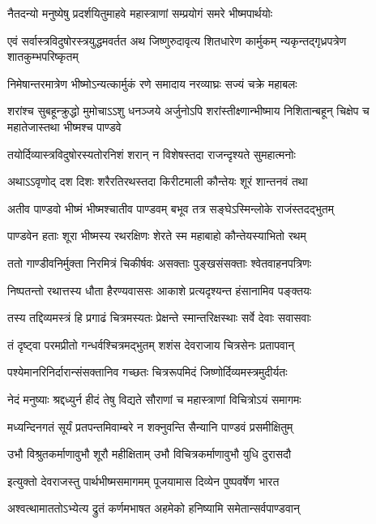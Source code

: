 \twolineshloka
{नैतदन्यो मनुष्येषु प्रदर्शयितुमाहवे}
{महास्त्राणां सम्प्रयोगं समरे भीष्मपार्थयोः}


\onelineshloka
{एवं सर्वास्त्रविदुषोरस्त्रयुद्धमवर्तत}
\twolineshloka
{अथ जिष्णुरुदावृत्य शितधारेण कार्मुकम्}
{न्यकृन्तद्गृध्रपत्रेण शातकुम्भपरिष्कृतम्}


\twolineshloka
{निमेषान्तरमात्रेण भीष्मोऽन्यत्कार्मुकं रणे}
{समादाय नरव्याघ्रः सज्यं चक्रे महाबलः}


\threelineshloka
{शरांश्च सुबहून्क्रुद्धो मुमोचाऽऽशु धनञ्जये}
{अर्जुनोऽपि शरांस्तीक्ष्णान्भीष्माय निशितान्बहून्}
{चिक्षेप च महातेजास्तथा भीष्मश्च पाण्डवे}


\twolineshloka
{तयोर्दिव्यास्त्रविदुषोरस्यतोरनिशं शरान्}
{न विशेषस्तदा राजन्दृश्यते सुमहात्मनोः}


\twolineshloka
{अथाऽऽवृणोद् दश दिशः शरैरतिरथस्तदा}
{किरीटमाली कौन्तेयः शूरं शान्तनवं तथा}


\twolineshloka
{अतीव पाण्डवो भीष्मं भीष्मश्चातीव पाण्डवम्}
{बभूव तत्र सङ्घेऽस्मिन्लोके राजंस्तदद्भुतम्}


\twolineshloka
{पाण्डवेन हताः शूरा भीष्मस्य रथरक्षिणः}
{शेरते स्म महाबाहो कौन्तेयस्याभितो रथम्}


\twolineshloka
{ततो गाण्डीवनिर्मुक्ता निरमित्रं चिकीर्षवः}
{असक्ताः पुङ्खसंसक्ताः श्वेतवाहनपत्रिणः}


\twolineshloka
{निष्पतन्तो रथात्तस्य धौता हैरण्यवाससः}
{आकाशे प्रत्यदृश्यन्त हंसानामिव पङ्क्तयः}


\twolineshloka
{तस्य तद्दिव्यमस्त्रं हि प्रगाढं चित्रमस्यतः}
{प्रेक्षन्ते स्मान्तरिक्षस्थाः सर्वे देवाः सवासवाः}


\twolineshloka
{तं दृष्ट्वा परमप्रीतो गन्धर्वश्चित्रमद्भुतम्}
{शशंस देवराजाय चित्रसेनः प्रतापवान्}


\twolineshloka
{पश्येमानरिनिर्दारान्संसक्तानिव गच्छतः}
{चित्ररूपमिदं जिष्णोर्दिव्यमस्त्रमुदीर्यतः}


\twolineshloka
{नेदं मनुष्याः श्रद्दध्युर्न हीदं तेषु विद्यते}
{सौराणां च महास्त्राणां विचित्रोऽयं समागमः}


\twolineshloka
{मध्यन्दिनगतं सूर्यं प्रतपन्तमिवाम्बरे}
{न शक्नुवन्ति सैन्यानि पाण्डवं प्रसमीक्षितुम्}


\twolineshloka
{उभौ विश्रुतकर्माणावुभौ शूरौ महीक्षिताम्}
{उभौ विचित्रकर्माणावुभौ युधि दुरासदौ}


\twolineshloka
{इत्युक्तो देवराजस्तु पार्थभीष्मसमागमम्}
{पूजयामास दिव्येन पुष्पवर्षेण भारत}


\twolineshloka
{अश्वत्थामाततोऽभ्येत्य द्रुतं कर्णमभाषत}
{अहमेको हनिष्यामि समेतान्सर्वपाण्डवान्}


